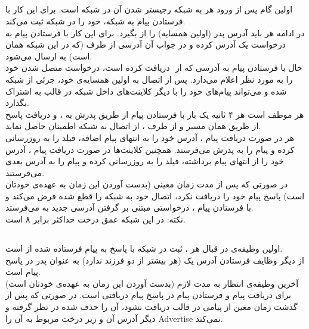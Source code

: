 \documentclass{article}
\begin{document}
\subsection{}
   اولین گام پس از ورود هر  به شبکه رجیستر شدن آن در شبکه است. برای این کار  با فرستادن پیام  به  شبکه، خود را در شبکه ثبت می‌کند.\\
   در ادامه هر  باید آدرس  پدر (اولین همسایه‌) را از  بگیرد. برای این کار  با فرستادن پیام  به  درخواست یک آدرس کرده و در جواب آن آدرسی از طرف  (که در این شبکه همان  است) به  ارسال می‌شود.\\
   حال  با فرستادن پیام  به آدرسی که از ‌ دریافت کرده است، درخواست متصل شدن خود را به  مورد نظر اعلام می‌دارد.  پس از اتصال به اولین همسایه‌ی خود، جزئی از شبکه شده و می‌تواند پیام‌های خود را با دیگر کلاینت‌های داخل شبکه در قالب  به اشتراک بگذارد.\\
   هر  موظف است هر ۴ ثانیه یک بار با فرستادن پیام  از طریق پدرش به ، و دریافت پاسخ  از طریق همان مسیر و از طرف ، از اتصال به شبکه اطمینان حاصل نماید.\\
   هر  در صورت دریافت پیام ، آدرس خود را به انتهای پیام اضافه، فیلد  را به روزرسانی کرده و پیام را به پدرش می‌فرستد. همچنین کلاینت‌ها در صورت دریافت پیام ، آدرس خود را از انتهای پیام برداشته، فیلد  را به روزرسانی کرده و پیام را به آدرس بعدی می‌فرستند.\\
   در صورتی که پس از مدت زمان معینی (بدست آوردن این زمان به عهده‌ی خودتان است)  پاسخ پیام  خود را دریافت نکرد، اتصال خود به شبکه را قطع شده فرض می‌کند و با فرستادن پیام ، درخواستی مبتنی بر گرفتن آدرسی جدید به  می‌فرستد.\\
   نکته: در این شبکه عمق درخت حداکثر برابر ۸ است.\\
   
   
   
\subsection{}
اولین وظیفه‌ی  در قبال هر ، ثبت  در شبکه با پاسخ به پیام   فرستاده شده از  است. \\
از دیگر وظایف  فرستادن آدرس یک  (هر  بیشتر از دو فرزند ندارد) به عنوان  پدر در پاسخ پیام  است.\\
آخرین وظیفه‌ی  انتظار به مدت لازم (بدست آوردن این زمان به عهده‌ی خودتان است) برای دریافت پیام  و فرستادن پیام  در پاسخ پیام دریافتی است. در صورتی که پس از گذشت زمان معین از  پیامی در قالب  دریافت نشود،  آن  را حذف شده در نظر گرفته و دیگر آدرس آن  و زیر درخت مربوط به آن را Advertise نمی‌کند.\\
\end{document}
